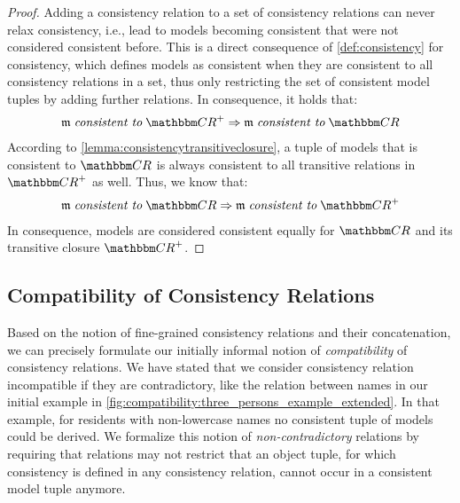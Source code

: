 \begin{proof}
    Adding a consistency relation to a set of consistency relations can never relax consistency, i.e., lead to models becoming consistent that were not considered consistent before. This is a direct consequence of \autoref{def:consistency} for consistency, which defines models as consistent when they are consistent to all consistency relations in a set, thus only restricting the set of consistent model tuples by adding further relations.
    In consequence, it holds that:
    \begin{align*}
        \modeltuple{m} \consistenttomath \transitiveclosure{\consistencyrelationset{CR}} \Rightarrow \modeltuple{m} \consistenttomath \consistencyrelationset{CR}
    \end{align*}
    According to \autoref{lemma:consistencytransitiveclosure}, a tuple of models that is consistent to $\consistencyrelationset{CR}$ is always consistent to all transitive relations in $\transitiveclosure{\consistencyrelationset{CR}}$ as well. Thus, we know that:
    \begin{align*}
        \modeltuple{m} \consistenttomath \consistencyrelationset{CR} \Rightarrow
        \modeltuple{m} \consistenttomath \transitiveclosure{\consistencyrelationset{CR}}
    \end{align*}
    In consequence, models are considered consistent equally for $\consistencyrelationset{CR}$ and its transitive closure $\transitiveclosure{\consistencyrelationset{CR}}$.
\end{proof}


\subsection{Compatibility of Consistency Relations}

Based on the notion of fine-grained consistency relations and their concatenation, we can precisely formulate our initially informal notion of \emph{compatibility} of consistency relations.
We have stated that we consider consistency relation incompatible if they are contradictory, like the relation between names in our initial example in \autoref{fig:compatibility:three_persons_example_extended}.
In that example, for residents with non-lowercase names no consistent tuple of models could be derived.
We formalize this notion of \emph{non-contradictory} relations by requiring that relations may not restrict that an object tuple, for which consistency is defined in any consistency relation, cannot occur in a consistent model tuple anymore.

